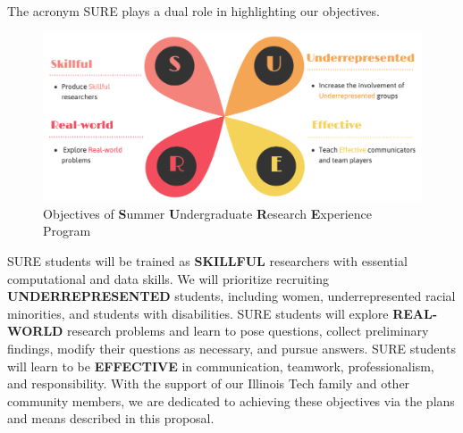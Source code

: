 \documentclass[11pt]{NSFamsart}
\begin{document}
The acronym SURE plays a dual role in highlighting our objectives.


\begin{figure}[bh]
    \centering
    \includegraphics[width = 14cm]{SURE_1_3.png}
    \caption{Objectives of {\bf S}ummer {\bf U}ndergraduate {\bf R}esearch {\bf E}xperience Program}
    \label{fig:sure_obj}
\end{figure}

SURE students will be trained as \uppercase{\textbf{skillful}} researchers with essential computational and data skills. 
We will prioritize recruiting \uppercase{\textbf{underrepresented}} students, including women, underrepresented racial minorities, and students with disabilities. 
SURE students will explore 
\uppercase{\textbf{Real-world}} research problems and learn to pose questions, collect preliminary findings, modify their questions as necessary, and pursue answers. 
SURE students will learn to 
be \uppercase{\textbf{effective}} in communication, teamwork,  professionalism, and responsibility. 
With the support of our Illinois Tech family and other community members, we are dedicated to achieving these objectives via the plans and means described in this proposal. 






\end{document}

